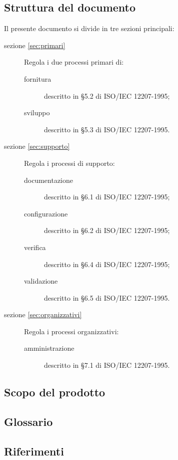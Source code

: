 \subsection{Struttura del documento}
Il presente documento si divide in tre sezioni principali:
\begin{description}
	\item[sezione \ref{sec:primari}] Regola i due processi primari di:
	\begin{description}
		\item[fornitura] descritto in §5.2 di ISO/IEC 12207-1995;
		\item[sviluppo] descritto in §5.3 di ISO/IEC 12207-1995.
	\end{description}
	\item[sezione \ref{sec:supporto}] Regola i processi di supporto:
	\begin{description}
		\item[documentazione] descritto in §6.1 di ISO/IEC 12207-1995;
		\item[configurazione] descritto in §6.2 di ISO/IEC 12207-1995;
		\item[verifica] descritto in §6.4 di ISO/IEC 12207-1995;
		\item[validazione] descritto in §6.5 di ISO/IEC 12207-1995.
	\end{description}
	\item[sezione \ref{sec:organizzativi}] Regola i processi organizzativi:
	\begin{description}
		\item[amministrazione] descritto in §7.1 di ISO/IEC 12207-1995.
	\end{description}
\end{description}

\subsection{Scopo del prodotto}
\scopo

\subsection{Glossario}
\presgloss

\subsection{Riferimenti} \label{sec:ref}

